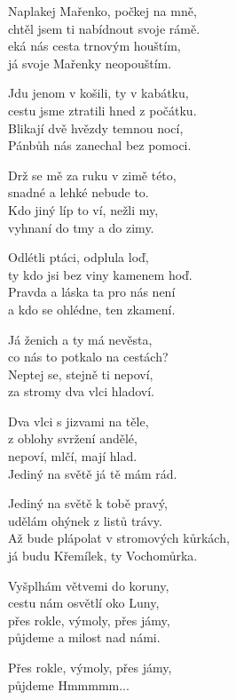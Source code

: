 
\vspace{-5pt}
\ve{}
Naplakej Mařenko, počkej na mně,\\
chtěl jsem ti nabídnout svoje rámě.\\
eká nás cesta trnovým houštím,\\
já svoje Mařenky neopouštím. 

\vspace{-5pt}

\ve{}
Jdu jenom v košili, ty v kabátku,\\
cestu jsme ztratili hned z počátku.\\
Blikají dvě hvězdy temnou nocí,\\
Pánbůh nás zanechal bez pomoci.

\vspace{-5pt}

\ve{}
Drž se mě za ruku v zimě této,\\
snadné a lehké nebude to.\\
Kdo jiný líp to ví, nežli my,\\
vyhnaní do tmy a do zimy.

\vspace{-5pt}

\ve{}
Odlétli ptáci, odplula loď,\\
ty kdo jsi bez viny kamenem hoď.\\
Pravda a láska ta pro nás není\\
a kdo se ohlédne, ten zkamení.

\vspace{-5pt}

\ve{}
Já ženich a ty má nevěsta,\\
co nás to potkalo na cestách?\\
Neptej se, stejně ti nepoví,\\
za stromy dva vlci hladoví.

\vspace{-5pt}

\ve{}
Dva vlci s jizvami na těle,\\
z oblohy svržení andělé,\\
nepoví, mlčí, mají hlad.\\
Jediný na světě já tě mám rád.

\vspace{-5pt}

\ve{}
Jediný na světě k tobě pravý,\\
udělám ohýnek z listů trávy.\\
Až bude plápolat v stromových kůrkách,\\
já budu Křemílek, ty Vochomůrka.
    
\vspace{-5pt}

\ve{}
Vyšplhám větvemi do koruny,\\
cestu nám osvětlí oko Luny,\\
přes rokle, výmoly, přes jámy,\\
půjdeme a milost nad námi.

Přes rokle, výmoly, přes jámy,\\
půjdeme Hmmmmm...

\esong